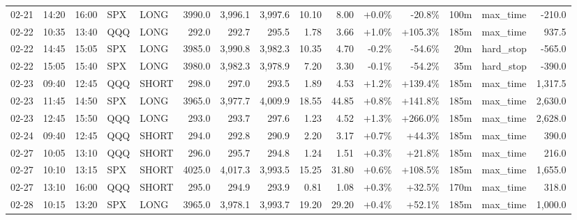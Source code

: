 \documentclass[11pt,a4paper,twoside]{article}
\begin{document}
\begin{landscape}
\begin{center}
\begin{longtable}{>{\color{txtmain}}l l l l l r r r r r r r r >{\color{txtmain}}l r}
02-21 & 14:20 & 16:00 & SPX & LONG & 3990.0 & 3,996.1 & 3,997.6 & 10.10 & 8.00 & \textcolor{wingreen}{+0.0\%} & \textcolor{lossred}{-20.8\%} & 100m & max\_time & \textcolor{lossred}{-210.0} \\
02-22 & 10:35 & 13:40 & QQQ & LONG & 292.0 & 292.7 & 295.5 & 1.78 & 3.66 & \textcolor{wingreen}{+1.0\%} & \textcolor{wingreen}{+105.3\%} & 185m & max\_time & \textcolor{wingreen}{937.5} \\
02-22 & 14:45 & 15:05 & SPX & LONG & 3985.0 & 3,990.8 & 3,982.3 & 10.35 & 4.70 & \textcolor{lossred}{-0.2\%} & \textcolor{lossred}{-54.6\%} & 20m & hard\_stop & \textcolor{lossred}{-565.0} \\
02-22 & 15:05 & 15:40 & SPX & LONG & 3980.0 & 3,982.3 & 3,978.9 & 7.20 & 3.30 & \textcolor{lossred}{-0.1\%} & \textcolor{lossred}{-54.2\%} & 35m & hard\_stop & \textcolor{lossred}{-390.0} \\
02-23 & 09:40 & 12:45 & QQQ & SHORT & 298.0 & 297.0 & 293.5 & 1.89 & 4.53 & \textcolor{wingreen}{+1.2\%} & \textcolor{wingreen}{+139.4\%} & 185m & max\_time & \textcolor{wingreen}{1,317.5} \\
02-23 & 11:45 & 14:50 & SPX & LONG & 3965.0 & 3,977.7 & 4,009.9 & 18.55 & 44.85 & \textcolor{wingreen}{+0.8\%} & \textcolor{wingreen}{+141.8\%} & 185m & max\_time & \textcolor{wingreen}{2,630.0} \\
02-23 & 12:45 & 15:50 & QQQ & LONG & 293.0 & 293.7 & 297.6 & 1.23 & 4.52 & \textcolor{wingreen}{+1.3\%} & \textcolor{wingreen}{+266.0\%} & 185m & max\_time & \textcolor{wingreen}{2,628.0} \\
02-24 & 09:40 & 12:45 & QQQ & SHORT & 294.0 & 292.8 & 290.9 & 2.20 & 3.17 & \textcolor{wingreen}{+0.7\%} & \textcolor{wingreen}{+44.3\%} & 185m & max\_time & \textcolor{wingreen}{390.0} \\
02-27 & 10:05 & 13:10 & QQQ & SHORT & 296.0 & 295.7 & 294.8 & 1.24 & 1.51 & \textcolor{wingreen}{+0.3\%} & \textcolor{wingreen}{+21.8\%} & 185m & max\_time & \textcolor{wingreen}{216.0} \\
02-27 & 10:10 & 13:15 & SPX & SHORT & 4025.0 & 4,017.3 & 3,993.5 & 15.25 & 31.80 & \textcolor{wingreen}{+0.6\%} & \textcolor{wingreen}{+108.5\%} & 185m & max\_time & \textcolor{wingreen}{1,655.0} \\
02-27 & 13:10 & 16:00 & QQQ & SHORT & 295.0 & 294.9 & 293.9 & 0.81 & 1.08 & \textcolor{wingreen}{+0.3\%} & \textcolor{wingreen}{+32.5\%} & 170m & max\_time & \textcolor{wingreen}{318.0} \\
02-28 & 10:15 & 13:20 & SPX & LONG & 3965.0 & 3,978.1 & 3,993.7 & 19.20 & 29.20 & \textcolor{wingreen}{+0.4\%} & \textcolor{wingreen}{+52.1\%} & 185m & max\_time & \textcolor{wingreen}{1,000.0} \\

\end{longtable}
\end{center}
\end{landscape}
\end{document}
